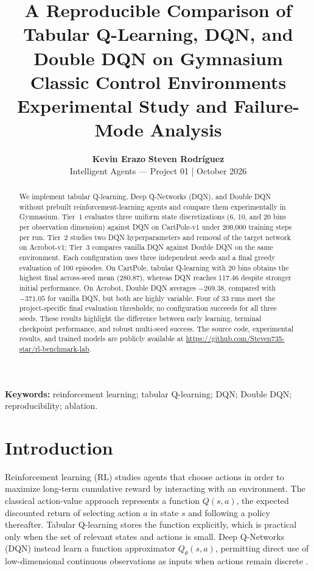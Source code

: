 \documentclass[a4paper,10pt,twocolumn]{article}
\title{\vspace{-1.35cm}\bfseries A Reproducible Comparison of Tabular Q-Learning, DQN, and Double DQN on Gymnasium Classic Control Environments\\[3pt]
\large Experimental Study and Failure-Mode Analysis}
\author{\textbf{Kevin Erazo} \quad \textbf{Steven Rodríguez}\\
\small Intelligent Agents --- Project 01 \quad | \quad October 2026}
\date{}
\begin{document}
\maketitle
\vspace{-1.0cm}

\begin{abstract}
We implement tabular Q-learning, Deep Q-Networks (DQN), and Double DQN without prebuilt reinforcement-learning agents and compare them experimentally in Gymnasium. Tier~1 evaluates three uniform state discretizations (6, 10, and 20 bins per observation dimension) against DQN on CartPole-v1 under 200,000 training steps per run. Tier~2 studies two DQN hyperparameters and removal of the target network on Acrobot-v1; Tier~3 compares vanilla DQN against Double DQN on the same environment. Each configuration uses three independent seeds and a final greedy evaluation of 100 episodes. On CartPole, tabular Q-learning with 20 bins obtains the highest final across-seed mean (280.87), whereas DQN reaches 117.46 despite stronger initial performance. On Acrobot, Double DQN averages $-269.38$, compared with $-371.05$ for vanilla DQN, but both are highly variable. Four of 33 runs meet the project-specific final evaluation thresholds; no configuration succeeds for all three seeds. These results highlight the difference between early learning, terminal checkpoint performance, and robust multi-seed success. The source code, experimental results, and trained models are publicly available at \url{https://github.com/Steven735-star/rl-benchmark-lab}.
\end{abstract}

\noindent\textbf{Keywords:} reinforcement learning; tabular Q-learning; DQN; Double DQN; reproducibility; ablation.

\section{Introduction}
Reinforcement learning (RL) studies agents that choose actions in order to maximize long-term cumulative reward by interacting with an environment. The classical action-value approach represents a function $Q(s,a)$, the expected discounted return of selecting action $a$ in state $s$ and following a policy thereafter. Tabular Q-learning stores the function explicitly, which is practical only when the set of relevant states and actions is small. Deep Q-Networks (DQN) instead learn a function approximator $Q_\theta(s,a)$, permitting direct use of low-dimensional continuous observations as inputs when actions remain discrete \cite{sutton2018,mnih2015}.
\end{document}
